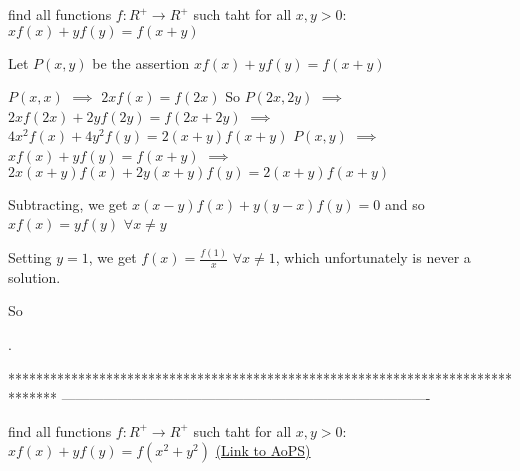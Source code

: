 \begin{solution}
	\begin{tcolorbox}find all functions $f:R^+ \rightarrow R^+$ such taht for all $x,y>0$:
$xf(x)+yf(y)=f(x+y)$\end{tcolorbox}
Let $P(x,y)$ be the assertion $xf(x)+yf(y)=f(x+y)$

$P(x,x)$ $\implies$ $2xf(x)=f(2x)$
So $P(2x,2y)$ $\implies$ $2xf(2x)+2yf(2y)=f(2x+2y)$ $\implies$ $4x^2f(x)+4y^2f(y)=2(x+y)f(x+y)$
$P(x,y)$ $\implies$ $xf(x)+yf(y)=f(x+y)$ $\implies$ $2x(x+y)f(x)+2y(x+y)f(y)=2(x+y)f(x+y)$

Subtracting, we get $x(x-y)f(x)+y(y-x)f(y)=0$ and so $xf(x)=yf(y)$ $\forall x\ne y$

Setting $y=1$, we get $f(x)=\frac{f(1)}x$ $\forall x\ne 1$, which unfortunately is never a solution.

So .
\end{solution}
*******************************************************************************
-------------------------------------------------------------------------------

\begin{problem}
	find all functions $f:R^+ \rightarrow R^+$ such taht for all $x,y>0$:
$xf(x)+yf(y)=f(x^2+y^2)$
	\flushright \href{https://artofproblemsolving.com/community/c6h572567}{(Link to AoPS)}
\end{problem}



